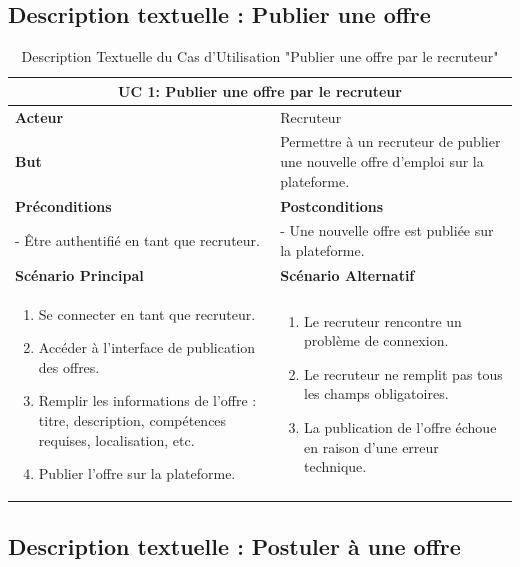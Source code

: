 \subsection{Description textuelle : Publier une offre}
\begin{minipage}{\textwidth}
    \begin{table}[H]
    \centering
    \caption{Description Textuelle du Cas d'Utilisation "Publier une offre par le recruteur"}
    \begin{tabular}{| m{8cm} | m{8cm} |}
    \hline
    \multicolumn{2}{|c|}{\textbf{UC 1:} Publier une offre par le recruteur} \\ \hline
    \textbf{Acteur} & Recruteur \\ \hline
    \textbf{But} & Permettre à un recruteur de publier une nouvelle offre d'emploi sur la plateforme. \\ \hline
    \textbf{Préconditions} & \textbf{Postconditions} \\ \hline
    - Être authentifié en tant que recruteur. & - Une nouvelle offre est publiée sur la plateforme. \\ \hline
    \textbf{Scénario Principal} & \textbf{Scénario Alternatif} \\ \hline
    \begin{enumerate}
        \item Se connecter en tant que recruteur.
        \item Accéder à l'interface de publication des offres.
        \item Remplir les informations de l'offre : titre, description, compétences requises, localisation, etc.
        \item Publier l'offre sur la plateforme.
    \end{enumerate} & 
    \begin{enumerate}
        \item Le recruteur rencontre un problème de connexion.
        \item Le recruteur ne remplit pas tous les champs obligatoires.
        \item La publication de l'offre échoue en raison d'une erreur technique.
    \end{enumerate} \\ \hline
    \end{tabular}
    \label{tab:UCPublier_Offre}
    \end{table}
\end{minipage}

\subsection{Description textuelle : Postuler à une offre}

